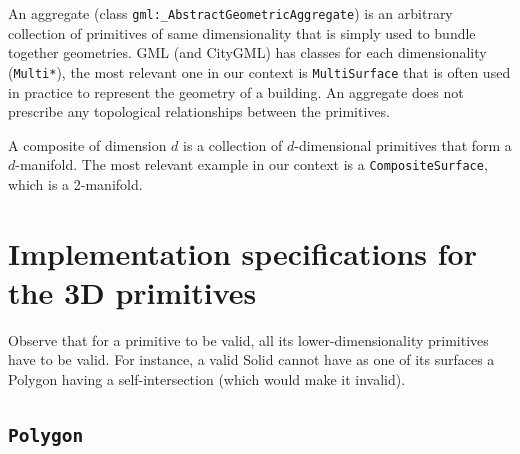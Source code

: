 An aggregate (class \texttt{gml:\_AbstractGeometricAggregate}) is an arbitrary collection of primitives of same dimensionality that is simply used to bundle together geometries.
GML (and CityGML) has classes for each dimensionality (\texttt{Multi*}), the most relevant one in our context is \texttt{MultiSurface} that is often used in practice to represent the geometry of a building.
An aggregate does not prescribe any topological relationships between the primitives.

A composite of dimension $d$ is a collection of $d$-dimensional primitives that form a $d$-manifold. 
The most relevant example in our context is a \texttt{CompositeSurface}, which is a 2-manifold.



%
\section[Implementation specifications]{Implementation specifications for the 3D primitives}


Observe that for a primitive to be valid, all its lower-dimensionality primitives have to be valid.
For instance, a valid Solid cannot have as one of its surfaces a Polygon having a self-intersection (which would make it invalid).


\subsection{\texttt{Polygon}}

